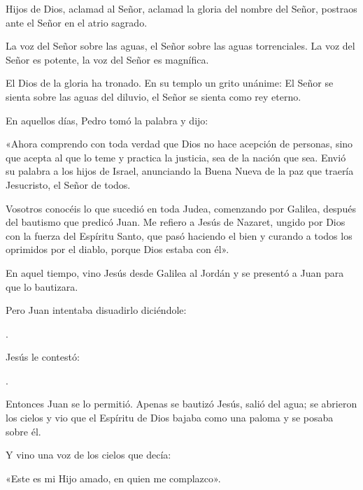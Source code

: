 		
		\begin{psbody}
			Hijos de Dios, aclamad al Señor,
			aclamad la gloria del nombre del Señor,
			postraos ante el Señor en el atrio sagrado.
			
			La voz del Señor sobre las aguas,
			el Señor sobre las aguas torrenciales.
			La voz del Señor es potente,
			la voz del Señor es magnífica.
			
			El Dios de la gloria ha tronado.
			En su templo un grito unánime: 
			El Señor se sienta sobre las aguas del diluvio,
			el Señor se sienta como rey eterno.
		\end{psbody}


		
		 
		
		
		\begin{scripture}
			En aquellos días, Pedro tomó la palabra y dijo:
			
			«Ahora comprendo con toda verdad que Dios no hace acepción de personas, sino que acepta al que lo teme y practica la justicia, sea de la nación que sea. Envió su palabra a los hijos de Israel, anunciando la Buena Nueva de la paz que traería Jesucristo, el Señor de todos.
			
			Vosotros conocéis lo que sucedió en toda Judea, comenzando por Galilea, después del bautismo que predicó Juan. Me refiero a Jesús de Nazaret, ungido por Dios con la fuerza del Espíritu Santo, que pasó haciendo el bien y curando a todos los oprimidos por el diablo, porque Dios estaba con él».
		\end{scripture}
	
	
	
	 
	
	
	\begin{scripture}
		En aquel tiempo, vino Jesús desde Galilea al Jordán y se presentó a Juan para que lo bautizara.
		
		Pero Juan intentaba disuadirlo diciéndole:
		
		.
		
		Jesús le contestó:
		
		.
		
		Entonces Juan se lo permitió. Apenas se bautizó Jesús, salió del agua; se abrieron los cielos y vio que el Espíritu de Dios bajaba como una paloma y se posaba sobre él.
		
		Y vino una voz de los cielos que decía:
		
		«Este es mi Hijo amado, en quien me complazco».
	\end{scripture}


